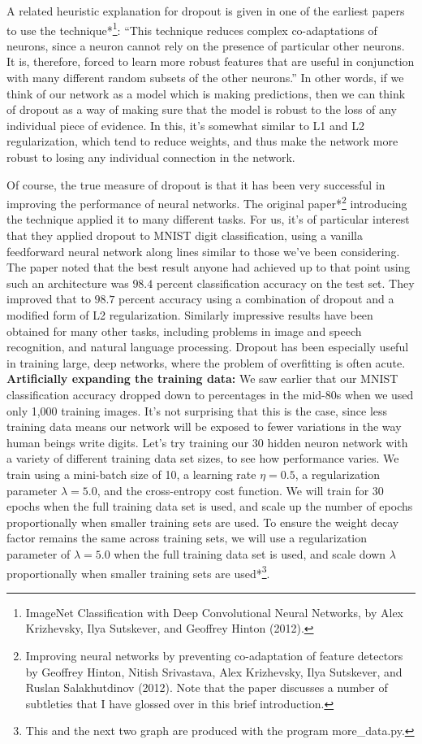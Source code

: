 A related heuristic explanation for dropout is given in one of the earliest papers to use the technique*\footnote{ImageNet Classification with Deep Convolutional Neural Networks, by Alex Krizhevsky, Ilya Sutskever, and Geoffrey Hinton (2012).}: ``This technique reduces complex co-adaptations of neurons, since a neuron cannot rely on the presence of particular other neurons. It is, therefore, forced to learn more robust features that are useful in conjunction with many different random subsets of the other neurons.'' In other words, if we think of our network as a model which is making predictions, then we can think of dropout as a way of making sure that the model is robust to the loss of any individual piece of evidence. In this, it's somewhat similar to L1 and L2 regularization, which tend to reduce weights, and thus make the network more robust to losing any individual connection in the network.


Of course, the true measure of dropout is that it has been very successful in improving the performance of neural networks. The original paper*\footnote{Improving neural networks by preventing co-adaptation of feature detectors by Geoffrey Hinton, Nitish Srivastava, Alex Krizhevsky, Ilya Sutskever, and Ruslan Salakhutdinov (2012). Note that the paper discusses a number of subtleties that I have glossed over in this brief introduction.} introducing the technique applied it to many different tasks. For us, it's of particular interest that they applied dropout to MNIST digit classification, using a vanilla feedforward neural network along lines similar to those we've been considering. The paper noted that the best result anyone had achieved up to that point using such an architecture was $98.4$ percent classification accuracy on the test set. They improved that to $98.7$ percent accuracy using a combination of dropout and a modified form of L2 regularization. Similarly impressive results have been obtained for many other tasks, including problems in image and speech recognition, and natural language processing. Dropout has been especially useful in training large, deep networks, where the problem of overfitting is often acute. \textbf{Artificially expanding the training data:} We saw earlier that our MNIST classification accuracy dropped down to percentages in the mid-80s when we used only 1,000 training images. It's not surprising that this is the case, since less training data means our network will be exposed to fewer variations in the way human beings write digits. Let's try training our 30 hidden neuron network with a variety of different training data set sizes, to see how performance varies. We train using a mini-batch size of 10, a learning rate $\eta = 0.5$, a regularization parameter $\lambda = 5.0$, and the cross-entropy cost function. We will train for 30 epochs when the full training data set is used, and scale up the number of epochs proportionally when smaller training sets are used. To ensure the weight decay factor remains the same across training sets, we will use a regularization parameter of $\lambda = 5.0$ when the full training data set is used, and scale down $\lambda$ proportionally when smaller training sets are used*\footnote{This and the next two graph are produced with the program more\_\allowbreak{}data.py.}.

